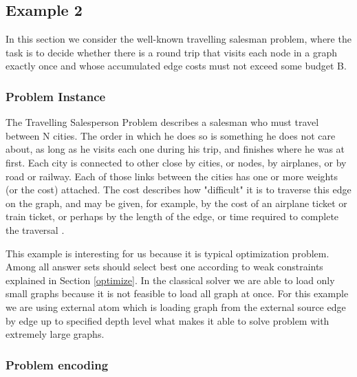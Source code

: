 \documentclass[14pt,a4paper, titlepage]{article}
\begin{document}
\subsection{Example 2}
\label{traveling}
In this section we consider the well-known travelling salesman problem, where the task is to decide whether there is a round trip that visits each node in a graph exactly once and whose accumulated edge costs must not exceed some budget B.

\subsubsection{Problem Instance}
The Travelling Salesperson Problem describes a salesman who must travel between N cities. The order in which he does so is something he does not care about, as long as he visits each one during his trip, and finishes where he was at first. Each city is connected to other close by cities, or nodes, by airplanes, or by road or railway. Each of those links between the cities has one or more weights (or the cost) attached. The cost describes how "difficult" it is to traverse this edge on the graph, and may be given, for example, by the cost of an airplane ticket or train ticket, or perhaps by the length of the edge, or time required to complete the traversal \cite{wiki}.

This example is interesting for us because it is typical optimization problem. Among all answer sets \dlvhex{} should select best one according to weak constraints explained in Section \ref{optimize}. In the classical solver we are able to load only small graphs because it is not feasible to load all graph at once. For this example we are using external atom which is loading graph from the external source edge by edge up to specified depth level what makes it able to solve problem with extremely large graphs.        


\subsubsection{Problem encoding}
\end{document}

